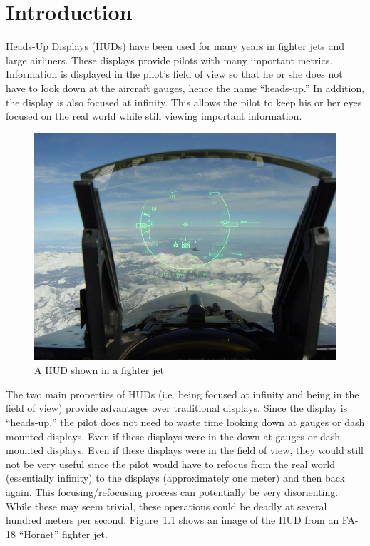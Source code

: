 \chapter{Introduction}

Heads-Up Displays (HUDs) have been used for many years in fighter jets and
large airliners. These displays provide pilots with many important metrics.
Information is displayed in the pilot's field of view so that he or she
does not have to look down at the aircraft gauges, hence the name
``heads-up.'' In addition, the display is also focused at infinity. This
allows the pilot to keep his or her eyes focused on the real world while
still viewing important information.

\begin{figure}[h]
\includegraphics[width=\textwidth]{img/JetHUD.jpg}
\caption{A HUD shown in a fighter jet}
\label{fig:jetHUD}
\end{figure}

The two main properties of HUDs (i.e. being focused at infinity and being
in the field of view) provide advantages over traditional displays. Since
the display is ``heads-up,'' the pilot does not need to waste time looking
down at gauges or dash mounted displays. Even if these displays were in the
down at gauges or dash mounted displays. Even if these displays were in the
field of view, they would still not be very useful since the pilot would
have to refocus from the real world (essentially infinity) to the displays
(approximately one meter) and then back again. This focusing/refocusing
process can potentially be very disorienting. While these may seem trivial,
these operations could be deadly at several hundred meters per second.
Figure~\ref{fig:jetHUD} shows an image of the HUD from an FA-18 ``Hornet''
fighter jet.

